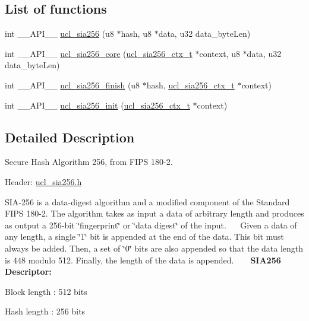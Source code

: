 \subsection*{List of functions}
\begin{DoxyCompactItemize}
\item 
int \+\_\+\+\_\+\+A\+P\+I\+\_\+\+\_\+ \hyperlink{group___u_c_l___s_i_a256_gad50391bbde94fe6c9f9bdf151f294ac5}{ucl\+\_\+sia256} (u8 $\ast$hash, u8 $\ast$data, u32 data\+\_\+byte\+Len)
\item 
int \+\_\+\+\_\+\+A\+P\+I\+\_\+\+\_\+ \hyperlink{group___u_c_l___s_i_a256_ga1a9ce20b83ba89514be822203d40f910}{ucl\+\_\+sia256\+\_\+core} (\hyperlink{group___u_c_l___s_i_a256_ga17e23ec55cac2194659d2b08c2a3f4ca}{ucl\+\_\+sia256\+\_\+ctx\+\_\+t} $\ast$context, u8 $\ast$data, u32 data\+\_\+byte\+Len)
\item 
int \+\_\+\+\_\+\+A\+P\+I\+\_\+\+\_\+ \hyperlink{group___u_c_l___s_i_a256_ga6cfa7bc32424e676a7d665470e832242}{ucl\+\_\+sia256\+\_\+finish} (u8 $\ast$hash, \hyperlink{group___u_c_l___s_i_a256_ga17e23ec55cac2194659d2b08c2a3f4ca}{ucl\+\_\+sia256\+\_\+ctx\+\_\+t} $\ast$context)
\item 
int \+\_\+\+\_\+\+A\+P\+I\+\_\+\+\_\+ \hyperlink{group___u_c_l___s_i_a256_ga2037616824d3d32416aa642c30499576}{ucl\+\_\+sia256\+\_\+init} (\hyperlink{group___u_c_l___s_i_a256_ga17e23ec55cac2194659d2b08c2a3f4ca}{ucl\+\_\+sia256\+\_\+ctx\+\_\+t} $\ast$context)
\end{DoxyCompactItemize}


\subsection{Detailed Description}
Secure Hash Algorithm 256, from F\+I\+PS 180-\/2.

\begin{DoxyParagraph}{Header\+:}
\hyperlink{ucl__sia256_8h}{ucl\+\_\+sia256.\+h }
\end{DoxyParagraph}
S\+I\+A-\/256 is a data-\/digest algorithm and a modified component of the Standard F\+I\+PS 180-\/2. The algorithm takes as input a data of arbitrary length and produces as output a 256-\/bit \char`\"{}fingerprint\char`\"{} or \char`\"{}data digest\char`\"{} of the input.~\newline
 ~\newline
 Given a data of any length, a single \char`\"{}1\char`\"{} bit is appended at the end of the data. This bit must always be added. Then, a set of \char`\"{}0\char`\"{} bits are also appended so that the data length is 448 modulo 512. Finally, the length of the data is appended. ~\newline
~\newline
 {\bfseries S\+I\+A256 Descriptor\+:} ~\newline
 \begin{DoxyItemize}
\item Block length \+: 512 bits \item Hash length \+: 256 bits \end{DoxyItemize}


